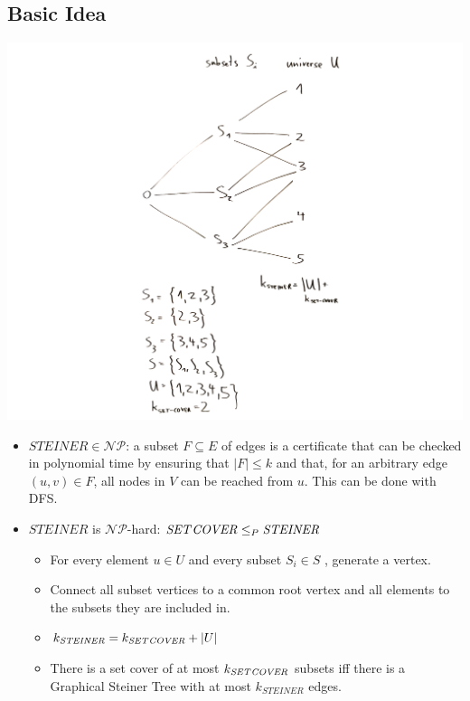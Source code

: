 \documentclass[12pt]{article}
\begin{document}
\subsection*{Basic Idea}
\includegraphics[width=\textwidth]{1_1.pdf}
\begin{itemize}
	\item $\mathit{STEINER} \in \mathcal{NP}$: a subset $F \subseteq E$ of edges is a certificate that can be checked in polynomial time by ensuring that $|F| \leq k$ and that, for an arbitrary edge $(u,v) \in F$, all nodes in $V$ can be reached from $u$. This can be done with DFS.
	\item $\mathit{STEINER}$ is $\mathcal{NP}$-hard: $\mathit{SET\-COVER} \leq_P \mathit{STEINER}$
	\begin{itemize}
		\item For every element $u \in U$ and every subset $S_i \in S$ , generate a vertex.
		\item Connect all subset vertices to a common root vertex and all elements to the subsets they are included in.
		\item $k_{\mathit{STEINER}} = k_{\mathit{SET\-COVER}} + |U|$
		\item There is a set cover of at most $k_{\mathit{SET\-COVER}}$ subsets iff there is a Graphical Steiner Tree with at most $k_{\mathit{STEINER}}$ edges.
	\end{itemize}
\end{itemize}
\end{document}
